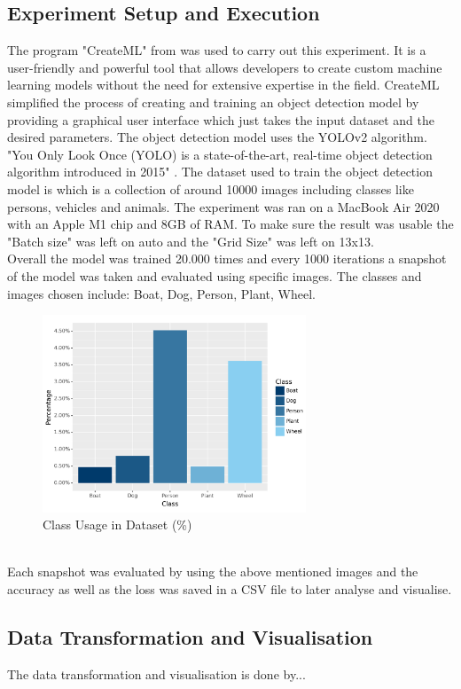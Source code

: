 \subsection{Experiment Setup and Execution}
The program "CreateML" from \cite{Apple} was used to carry out this experiment. It is a user-friendly and powerful 
tool that allows developers to create custom machine learning models without the need for extensive expertise in the field.
CreateML simplified the process of creating and training an object detection model by providing a graphical user interface which 
just takes the input dataset and the desired parameters. The object detection model uses the YOLOv2 \parencite{Jain} algorithm.
"You Only Look Once (YOLO) is a state-of-the-art, real-time object detection algorithm introduced in 2015" \parencite{Keita2022}. 
The dataset used to train the object detection model is  which is a collection of around 10000 images including classes
like persons, vehicles and animals. The experiment was ran on a MacBook Air 2020 with an Apple M1 chip and 8GB of RAM. To make sure the 
result was usable the "Batch size" was left on auto and the "Grid Size" was left on 13x13.\\
\newpage
Overall the model was trained 20.000 times and every 1000 iterations a snapshot of the model was taken and evaluated using
specific images. 
The classes and images chosen include: Boat, Dog, Person, Plant, Wheel.
\begin{figure}[h]
  \centering
  \includegraphics[width=0.70\textwidth]{../Data/distribution-classes-barchart.png}
  \caption{Class Usage in Dataset (\%)}
\end{figure}
\\
Each snapshot was evaluated by using the above mentioned images and the accuracy as well as the loss was saved in a CSV file to later 
analyse and visualise.

\subsection{Data Transformation and Visualisation}
The data transformation and visualisation is done by...

